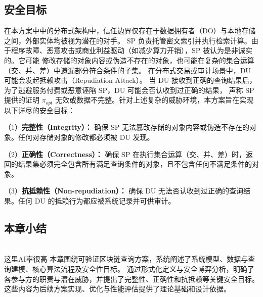\subsection{安全目标}
在本方案中中的分布式架构中，信任边界仅存在于数据拥有者（DO）与本地存储之间，外部实体均被视为潜在的对手。
SP 负责托管密文索引并执行检索计算。由于程序故障、恶意攻击或商业利益驱动（如减少算力开销），SP 被认为是非诚实的。它可能
修改存储的对象内容或伪造不存在的对象，也可能在复杂的集合运算（交、并、差）中遗漏部分符合条件的子集。
在分布式交易或审计场景中，DU 可能会发起抵赖攻击（Repudiation Attack）。
当 DU 接收到正确的查询结果后，为了逃避服务付费或恶意诬陷 SP，DU 可能会否认收到过正确的结果，
声称 SP 提供的证明 $\pi_{opt}$ 无效或数据不完整。针对上述复杂的威胁环境，本方案旨在实现以下详尽的安全目标：

（1）\quad \textbf{完整性（Integrity）：} 确保 SP 无法篡改存储的对象内容或伪造不存在的对象。任何对存储对象的修改都必须被 DU 发现。

（2）\quad \textbf{正确性（Correctness）：} 确保 SP 在执行集合运算（交、并、差）时，返回的结果集必须完全包含所有满足查询条件的对象，且不包含任何不满足条件的对象。

（3）\quad \textbf{抗抵赖性（Non-repudiation）：} 确保 DU 无法否认收到过正确的查询结果。任何 DU 的抵赖行为都应被系统记录并可供审计。


\subsection{本章小结}
\\这里AI率很高
本章围绕可验证区块链查询方案，系统阐述了系统模型、数据与查询建模、核心算法流程及安全性目标。
通过形式化定义与安全博弈分析，明确了各参与方的职责与潜在威胁，并提出了完整性、正确性和抗抵赖等关键安全目标。
这些内容为后续方案实现、优化与性能评估提供了理论基础和设计依据。

